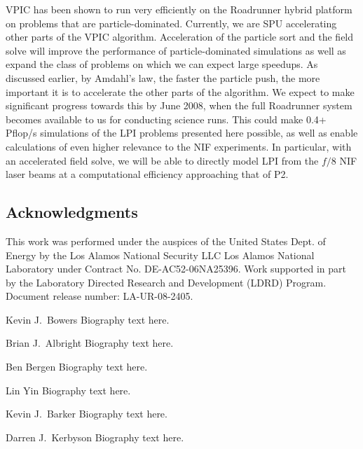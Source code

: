 \documentclass[journal,twoside]{IEEEtran}
\begin{document}
VPIC has been shown to run very efficiently on the Roadrunner hybrid
platform on problems that are particle-dominated.  Currently, we are
SPU accelerating other parts of the VPIC algorithm.  Acceleration of
the particle sort and the field solve will improve the performance of
particle-dominated simulations as well as expand the class of problems
on which we can expect large speedups.  As discussed earlier, by
Amdahl's law, the faster the particle push, the more important it is
to accelerate the other parts of the algorithm.  We expect to make
significant progress towards this by June 2008, when the full
Roadrunner system becomes available to us for conducting science runs.
This could make 0.4+ Pflop/s simulations of the LPI problems presented
here possible, as well as enable calculations of even higher relevance
to the NIF experiments. In particular, with an accelerated field
solve, we will be able to directly model LPI from the $f/8$ NIF laser
beams at a computational efficiency approaching that of P2.

\subsection*{Acknowledgments}

This work was performed under the auspices of the United States Dept.
of Energy by the Los Alamos National Security LLC Los Alamos National
Laboratory under Contract No. DE-AC52-06NA25396.  Work supported in
part by the Laboratory Directed Research and Development (LDRD)
Program.  Document release number: LA-UR-08-2405.




\begin{IEEEbiographynophoto}{Kevin J.~Bowers}
Biography text here.
\end{IEEEbiographynophoto}

\begin{IEEEbiographynophoto}{Brian J.~Albright}
Biography text here.
\end{IEEEbiographynophoto}

\begin{IEEEbiographynophoto}{Ben Bergen}
Biography text here.
\end{IEEEbiographynophoto}

\begin{IEEEbiographynophoto}{Lin Yin}
Biography text here.
\end{IEEEbiographynophoto}

\begin{IEEEbiographynophoto}{Kevin J.~Barker}
Biography text here.
\end{IEEEbiographynophoto}

\begin{IEEEbiographynophoto}{Darren J.~Kerbyson}
Biography text here.
\end{IEEEbiographynophoto}
\end{document}
